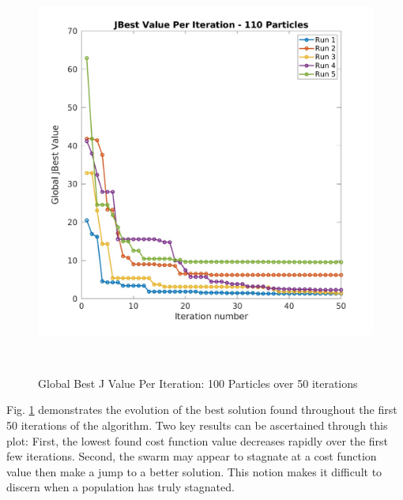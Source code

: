 \begin{figure}[H]
\includegraphics[width=\linewidth, height=13.5cm]{./jpgs/i50.jpg}
\caption{Global Best J Value Per Iteration: 100 Particles over 50 iterations}
\label{fig:gBestPer50Iter}
\end{figure}

\noindent Fig. \ref{fig:gBestPer50Iter} demonstrates the evolution of the best solution
found throughout the first 50 iterations of the algorithm. Two key results can be ascertained 
through this plot: First, the lowest found cost function value decreases rapidly over the first few
iterations. Second, the swarm may appear to stagnate at a cost function value then make a jump to a
better solution. This notion makes it difficult to discern when a population has truly stagnated. 

